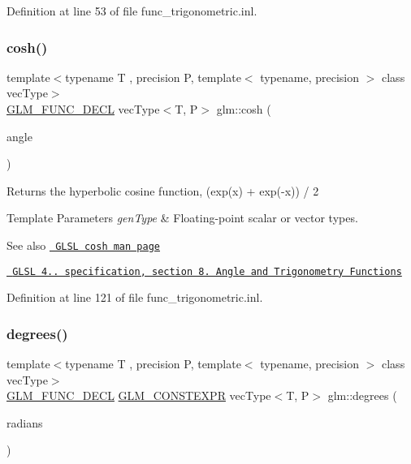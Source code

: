Definition at line 53 of file func\+\_\+trigonometric.\+inl.

\mbox{\label{group__core__func__trigonometric_ga660582a4e5e843b6c1cd535777e8c295}} 
\subsubsection{\texorpdfstring{cosh()}{cosh()}}
{\footnotesize\ttfamily template$<$typename T , precision P, template$<$ typename, precision $>$ class vec\+Type$>$ \\
\mbox{\hyperlink{setup_8hpp_ab2d052de21a70539923e9bcbf6e83a51}{G\+L\+M\+\_\+\+F\+U\+N\+C\+\_\+\+D\+E\+CL}} vec\+Type$<$T, P$>$ glm\+::cosh (\begin{DoxyParamCaption}\item[{vec\+Type$<$ T, P $>$ const \&}]{angle }\end{DoxyParamCaption})}

Returns the hyperbolic cosine function, (exp(x) + exp(-\/x)) / 2


\begin{DoxyTemplParams}{Template Parameters}
{\em gen\+Type} & Floating-\/point scalar or vector types.\\
\hline
\end{DoxyTemplParams}
\begin{DoxySeeAlso}{See also}
\href{http://www.opengl.org/sdk/docs/manglsl/xhtml/cosh.xml}{\texttt{ G\+L\+SL cosh man page}} 

\href{http://www.opengl.org/registry/doc/GLSLangSpec.4.20.8.pdf}{\texttt{ G\+L\+SL 4.. specification, section 8. Angle and Trigonometry Functions}} 
\end{DoxySeeAlso}


Definition at line 121 of file func\+\_\+trigonometric.\+inl.

\mbox{\label{group__core__func__trigonometric_gabccdcc282134fd62af0ff3d6e4bb21f1}} 
\subsubsection{\texorpdfstring{degrees()}{degrees()}}
{\footnotesize\ttfamily template$<$typename T , precision P, template$<$ typename, precision $>$ class vec\+Type$>$ \\
\mbox{\hyperlink{setup_8hpp_ab2d052de21a70539923e9bcbf6e83a51}{G\+L\+M\+\_\+\+F\+U\+N\+C\+\_\+\+D\+E\+CL}} \mbox{\hyperlink{setup_8hpp_a08b807947b47031d3a511f03f89645ad}{G\+L\+M\+\_\+\+C\+O\+N\+S\+T\+E\+X\+PR}} vec\+Type$<$T, P$>$ glm\+::degrees (\begin{DoxyParamCaption}\item[{vec\+Type$<$ T, P $>$ const \&}]{radians }\end{DoxyParamCaption})}

